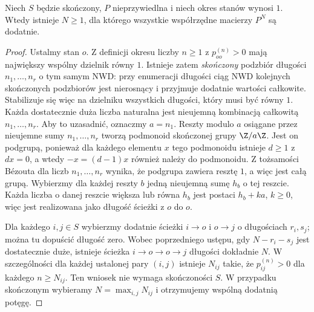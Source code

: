 \begin{lemat}
Niech $S$ będzie skończony, $P$ nieprzywiedlna
i niech okres stanów wynosi $1$. Wtedy istnieje
$N\geq1$, dla którego wszystkie współrzędne
macierzy $P^N$ są dodatnie.
\end{lemat}
\begin{proof}
Ustalmy stan $o$. Z definicji okresu liczby
$n\geq1$ z $p_{oo}^{(n)}>0$ mają największy
wspólny dzielnik równy $1$. Istnieje zatem
\emph{skończony} podzbiór długości
$n_1,\ldots,n_r$ o tym samym NWD: przy enumeracji
długości ciąg NWD kolejnych skończonych podzbiorów
jest nierosnący i przyjmuje dodatnie wartości
całkowite. Stabilizuje się więc na dzielniku
wszystkich długości, który musi być równy $1$.
Każda dostatecznie duża liczba naturalna jest
nieujemną kombinacją całkowitą $n_1,\ldots,n_r$.
Aby to uzasadnić, oznaczmy $a=n_1$.
Reszty modulo $a$ osiągane przez nieujemne sumy
$n_1,\ldots,n_r$ tworzą podmonoid skończonej
grupy $\Z/a\Z$. Jest on podgrupą, ponieważ
dla każdego elementu $x$ tego podmonoidu istnieje
$d\geq1$ z $dx=0$, a wtedy $-x=(d-1)x$ również
należy do podmonoidu. Z tożsamości Bézouta dla
liczb $n_1,\ldots,n_r$ wynika, że podgrupa zawiera
resztę $1$, a więc jest całą grupą.
Wybierzmy dla każdej reszty $b$ jedną nieujemną sumę
$h_b$ o tej reszcie. Każda liczba o danej reszcie
większa lub równa $h_b$ jest postaci $h_b+ka$,
$k\geq0$, więc jest realizowana jako długość
ścieżki z $o$ do $o$.

Dla każdego $i,j\in S$ wybierzmy dodatnie
ścieżki $i\to o$ i $o\to j$ o długościach
$r_i,s_j$; można tu dopuścić długość zero.
Wobec poprzedniego ustępu, gdy $N-r_i-s_j$
jest dostatecznie duże, istnieje ścieżka
$i\to o\to o\to j$ długości dokładnie $N$.
W szczególności dla każdej ustalonej pary $(i,j)$
istnieje $N_{ij}$ takie, że $p_{ij}^{(n)}>0$ dla
każdego $n\geq N_{ij}$. Ten wniosek nie wymaga
skończoności $S$. W przypadku skończonym wybieramy
$N=\max_{i,j}N_{ij}$ i otrzymujemy wspólną dodatnią
potęgę.
\end{proof}

